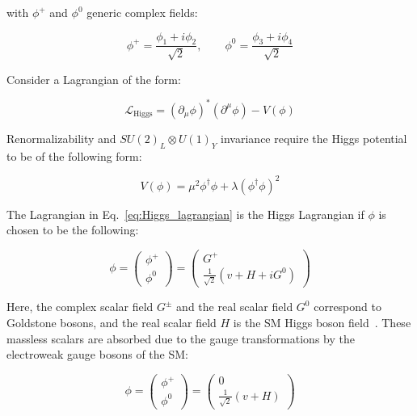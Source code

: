 			\noindent with $\phi^+$ and $\phi^0$ generic complex fields: 

			\begin{equation}
				\phi^+ = \frac{\phi_1 + i \phi_2}{\sqrt{2}},  \qquad \phi^0 = \frac{\phi_3 + i \phi_4}{\sqrt{2}}
			\end{equation}

			\noindent Consider a Lagrangian of the form: 

			\begin{equation}
			\label{eq:Higgs_lagrangian}
				\mathcal{L_{\mathrm{Higgs}}} = ( \partial_{\mu} \phi )^* \left ( \partial^{\mu} \phi \right ) - V(\phi)
			\end{equation}

			\noindent Renormalizability and $SU(2)_L \otimes U(1)_Y$ invariance require the Higgs potential to be of the following form: 

			\begin{equation}
			\label{eq:Higgs_potential}
				V(\phi) = \mu^2  \phi^\dagger \phi + \lambda \left ( \phi^\dagger \phi \right )^2 
			\end{equation}

			\noindent The Lagrangian in Eq.~\ref{eq:Higgs_lagrangian} is the Higgs Lagrangian if $\phi$ is chosen to be the following:

			\begin{equation*}
				\phi = 
				\begin{pmatrix}
					\phi^+ \\ \phi^0
				\end{pmatrix} 
				=
				\begin{pmatrix}
					G^+ \\ \frac{1}{\sqrt{2}} \left ( v + H + iG^0 \right )
				\end{pmatrix}
			\end{equation*}

			\noindent Here, the complex scalar field $G^\pm$ and the real scalar field $G^0$ correspond to Goldstone bosons, and the real scalar field $H$ is the SM Higgs boson field~\cite{Goldstone1962}. These massless scalars are absorbed due to the gauge transformations by the electroweak gauge bosons of the SM:

			\begin{equation}
			\label{eq:Higgs_doublet}
				\phi = 
				\begin{pmatrix}
					\phi^+ \\ \phi^0
				\end{pmatrix} 
				=
				\begin{pmatrix}
					0 \\ \frac{1}{\sqrt{2}} \left ( v + H \right )
				\end{pmatrix}
			\end{equation}

